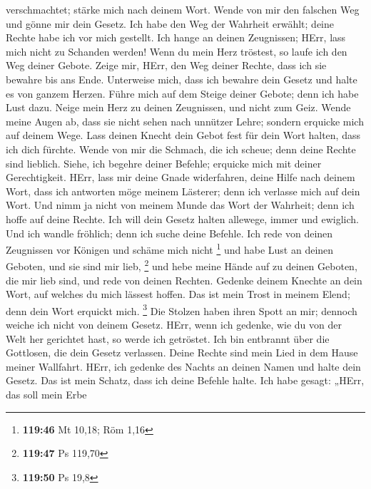 verschmachtet; stärke mich nach deinem Wort.  Wende von mir
den falschen Weg und gönne mir dein Gesetz.  Ich habe den
Weg der Wahrheit erwählt; deine Rechte habe ich vor mich gestellt.
 Ich hange an deinen Zeugnissen; HErr, lass mich nicht zu
Schanden werden!  Wenn du mein Herz tröstest, so laufe ich
den Weg deiner Gebote.  Zeige mir, HErr, den Weg deiner
Rechte, dass ich sie bewahre bis ans Ende.  Unterweise
mich, dass ich bewahre dein Gesetz und halte es von ganzem Herzen.
 Führe mich auf dem Steige deiner Gebote; denn ich habe
Lust dazu.  Neige mein Herz zu deinen Zeugnissen, und nicht
zum Geiz.  Wende meine Augen ab, dass sie nicht sehen nach
unnützer Lehre; sondern erquicke mich auf deinem Wege. 
Lass deinen Knecht dein Gebot fest für dein Wort halten, dass ich dich
fürchte.  Wende von mir die Schmach, die ich scheue; denn
deine Rechte sind lieblich.  Siehe, ich begehre deiner
Befehle; erquicke mich mit deiner Gerechtigkeit.  HErr,
lass mir deine Gnade widerfahren, deine Hilfe nach deinem Wort,
 dass ich antworten möge meinem Lästerer; denn ich verlasse
mich auf dein Wort.  Und nimm ja nicht von meinem Munde das
Wort der Wahrheit; denn ich hoffe auf deine Rechte.  Ich
will dein Gesetz halten allewege, immer und ewiglich.  Und
ich wandle fröhlich; denn ich suche deine Befehle.  Ich
rede von deinen Zeugnissen vor Königen und schäme mich nicht \footnote{\textbf{119:46}
  Mt 10,18; Röm 1,16}  und habe Lust an deinen Geboten, und
sie sind mir lieb, \footnote{\textbf{119:47} Ps 119,70} 
und hebe meine Hände auf zu deinen Geboten, die mir lieb sind, und rede
von deinen Rechten.  Gedenke deinem Knechte an dein Wort,
auf welches du mich lässest hoffen.  Das ist mein Trost in
meinem Elend; denn dein Wort erquickt mich. \footnote{\textbf{119:50} Ps
  19,8}  Die Stolzen haben ihren Spott an mir; dennoch
weiche ich nicht von deinem Gesetz.  HErr, wenn ich
gedenke, wie du von der Welt her gerichtet hast, so werde ich getröstet.
 Ich bin entbrannt über die Gottlosen, die dein Gesetz
verlassen.  Deine Rechte sind mein Lied in dem Hause meiner
Wallfahrt.  HErr, ich gedenke des Nachts an deinen Namen
und halte dein Gesetz.  Das ist mein Schatz, dass ich deine
Befehle halte.  Ich habe gesagt: „HErr, das soll mein Erbe
